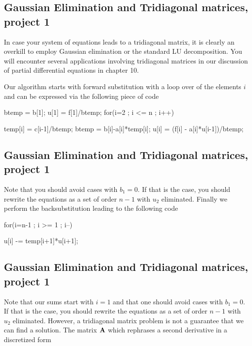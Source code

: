 \documentclass[%
twoside,                 %
final,                   %
10pt]{article}
\begin{document}
{{%
\subsection{Gaussian Elimination and Tridiagonal matrices, project 1}

In case your system of equations leads to a tridiagonal matrix, it is clearly an overkill to employ
Gaussian elimination or the standard LU decomposition.
You will encounter several applications involving tridiagonal matrices in our discussion of
partial differential equations in chapter 10.

Our algorithm starts with forward substitution with a loop over of the elements $i$ and can be expressed via the
following piece of code


\bcppcod
   btemp = b[1];
   u[1] = f[1]/btemp;
   for(i=2 ; i <= n ; i++) {
      temp[i] = c[i-1]/btemp;
      btemp = b[i]-a[i]*temp[i];
      u[i] = (f[i] - a[i]*u[i-1])/btemp;

\ecppcod

\subsection{Gaussian Elimination and Tridiagonal matrices, project 1}

Note that you should avoid cases with $b_1=0$. If that is the case, you should rewrite the equations
as a set of order $n-1$ with $u_2$ eliminated.
Finally we perform the backsubstitution leading to the following code

\bcppcod
   for(i=n-1 ; i >= 1 ; i--) {
      u[i] -= temp[i+1]*u[i+1];

\ecppcod

\subsection{Gaussian Elimination and Tridiagonal matrices, project 1}

Note that our sums start with $i=1$ and that one  should avoid cases with $b_1=0$. If that is the case, you should rewrite the equations
as a set of order $n-1$ with $u_2$ eliminated. However, a tridiagonal matrix problem is not a guarantee that we
can find a solution. The matrix ${\bf A}$ which rephrases a second derivative in a discretized form

}}}}
\end{document}
